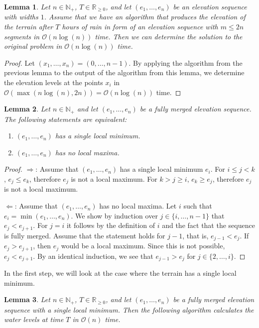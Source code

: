 \documentclass[11pt,a4paper]{article}
\newtheorem{lem}{Lemma}
\newcommand{\Np}{\mathbb{N}_+}
\newcommand{\bO}{\mathcal{O}}
\newcommand{\Rnn}{\mathbb{R}_{\ge0}}
\begin{document}
\begin{lem}
  Let $n\in\Np$, $T\in\Rnn$, and let $(e_1,\ldots,e_n)$ be an elevation sequence with widths $1$.
  Assume that we have an algorithm that produces the elevation of the terrain after $T$ hours of rain in form of an elevation sequence with $m \le 2n$ segments in $\bO(n\log(n))$ time.
  Then we can determine the solution to the original problem in $\bO(n\log(n))$ time.
\end{lem}

\begin{proof}
  Let $(x_1,\ldots,x_n) = (0,\ldots,n-1)$.
  By applying the algorithm from the previous lemma to the output of the algorithm from this lemma,
  we determine the elevation levels at the points $x_i$ in $\bO(\max(n\log(n), 2n)) = \bO(n\log(n))$ time.
\end{proof}

\begin{lem}
  Let $n\in\Np$ and let $(e_1,\ldots,e_n)$ be a fully merged elevation sequence.
  The following statements are equivalent:
  \begin{enumerate}
    \item $(e_1,\ldots,e_n)$ has a single local minimum.
    \item $(e_1,\ldots,e_n)$ has no local maxima.
  \end{enumerate}
\end{lem}

\begin{proof}
  $\Rightarrow$: Assume that $(e_1,\ldots,e_n)$ has a single local minimum $e_i$.
  For $i \le j < k$, $e_j \le e_k$, therefore $e_j$ is not a local maximum.
  For $k > j \ge i$, $e_k \ge e_j$, therefore $e_j$ is not a local maximum.

  $\Leftarrow$: Assume that $(e_1,\ldots,e_n)$ has no local maxima.
  Let $i$ such that $e_i = \min(e_1,\ldots,e_n)$.
  We show by induction over $j \in \{i,\ldots,n-1\}$ that $e_j < e_{j+1}$.
  For $j = i$ it follows by the definition of $i$ and the fact that the sequence is fully merged.
  Assume that the statement holds for $j-1$, that is, $e_{j-1} < e_j$.
  If $e_j > e_{j+1}$, then $e_j$ would be a local maximum.
  Since this is not possible, $e_j < e_{j+1}$.
  By an identical induction, we see that $e_{j-1} > e_j$ for $j \in \{2,\ldots,i\}$.
\end{proof}

In the first step, we will look at the case where the terrain has a single local minimum.

\begin{lem}
    Let $n\in\Np$, $T\in\Rnn$, and let $(e_1,\ldots,e_n)$ be a fully merged elevation sequence with a single local minimum.
    Then the following algorithm calculates the water levels at time $T$ in $\bO(n)$ time.
\end{lem}
\end{document}
